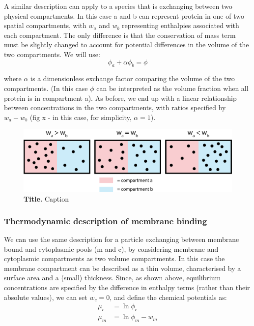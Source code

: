 \documentclass[12pt]{"article"}
\newcommand{\mycaption}[2]{\caption[#1]{\textbf{#1.} #2}}
\begin{document}
A similar description can apply to a species that is exchanging between two physical compartments. In this case a and b can represent protein in one of two spatial compartments, with $w_a$ and $w_b$ representing enthalpies associated with each compartment. The only difference is that the conservation of mass term must be slightly changed to account for potential differences in the volume of the two compartments. We will use:
\begin{equation}
\phi_a + \alpha\phi_b = \phi
\end{equation}

where $\alpha$ is a dimensionless exchange factor comparing the volume of the two compartments. (In this case $\phi$ can be interpreted as the volume fraction when all protein is in compartment a). As before, we end up with a linear relationship between concentrations in the two compartments, with ratios specified by $w_a - w_b$ (fig x - in this case, for simplicity, $\alpha = 1$).

\begin{figure}[!h]
\includegraphics[scale=0.9]{thermodynamic_simple_example}
\setlength{\abovecaptionskip}{20pt}
\centering
\mycaption{Title}{Caption}
\label{fig:thermodynamic_simple_example}
\end{figure}

\subsubsection{Thermodynamic description of membrane binding}

We can use the same description for a particle exchanging between membrane bound and cytoplasmic pools (m and c), by considering membrane and cytoplasmic compartments as two volume compartments. In this case the membrane compartment can be described as a thin volume, characterised by a surface area and a (small) thickness. Since, as shown above, equilibrium concentrations are specified by the difference in enthalpy terms (rather than their absolute values), we can set $w_c = 0$, and define the chemical potentials as:
\begin{align}
\mu_c &= \ln\phi_c\\
\mu_m &= \ln\phi_m - w_m
\end{align} 
\end{document}
